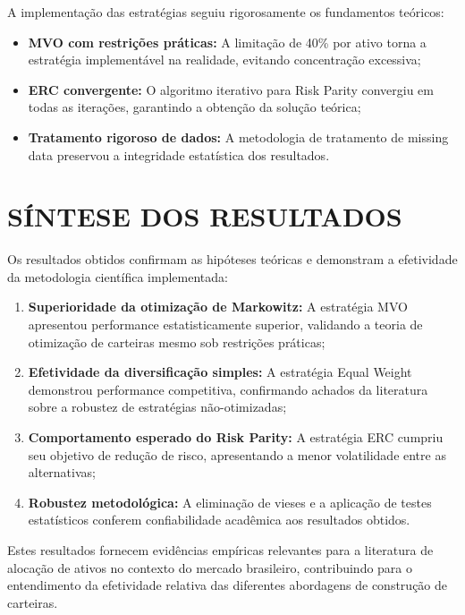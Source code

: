 A implementação das estratégias seguiu rigorosamente os fundamentos teóricos:

\begin{itemize}
    \item \textbf{MVO com restrições práticas:} A limitação de 40\% por ativo torna a estratégia implementável na realidade, evitando concentração excessiva;
    
    \item \textbf{ERC convergente:} O algoritmo iterativo para Risk Parity convergiu em todas as iterações, garantindo a obtenção da solução teórica;
    
    \item \textbf{Tratamento rigoroso de dados:} A metodologia de tratamento de missing data preservou a integridade estatística dos resultados.
\end{itemize}

\section{SÍNTESE DOS RESULTADOS}

Os resultados obtidos confirmam as hipóteses teóricas e demonstram a efetividade da metodologia científica implementada:

\begin{enumerate}
    \item \textbf{Superioridade da otimização de Markowitz:} A estratégia MVO apresentou performance estatisticamente superior, validando a teoria de otimização de carteiras mesmo sob restrições práticas;
    
    \item \textbf{Efetividade da diversificação simples:} A estratégia Equal Weight demonstrou performance competitiva, confirmando achados da literatura sobre a robustez de estratégias não-otimizadas;
    
    \item \textbf{Comportamento esperado do Risk Parity:} A estratégia ERC cumpriu seu objetivo de redução de risco, apresentando a menor volatilidade entre as alternativas;
    
    \item \textbf{Robustez metodológica:} A eliminação de vieses e a aplicação de testes estatísticos conferem confiabilidade acadêmica aos resultados obtidos.
\end{enumerate}

Estes resultados fornecem evidências empíricas relevantes para a literatura de alocação de ativos no contexto do mercado brasileiro, contribuindo para o entendimento da efetividade relativa das diferentes abordagens de construção de carteiras.